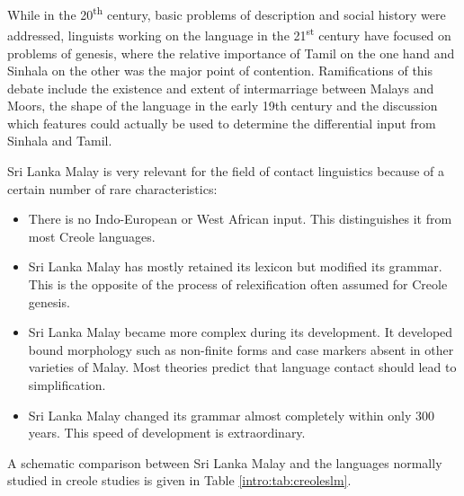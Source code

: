 While in the 20\textsuperscript{th} century, basic problems of description and social history were addressed, linguists working on the language in the 21\textsuperscript{st} century have focused on problems of genesis, where the relative importance of Tamil on the one hand and Sinhala on the other was the major point of contention. Ramifications of this debate include the existence and extent of intermarriage between Malays and Moors, the shape of the language in the early 19th century and the discussion which features could actually be used to determine the differential input from Sinhala and Tamil.

Sri Lanka Malay is very relevant for the field of contact linguistics because of a certain number of rare characteristics:
\begin{itemize}
 \item There is no Indo-European or West African input. This distinguishes it from most Creole languages.
 \item Sri Lanka Malay has mostly retained its lexicon but modified its grammar. This is the opposite of the  process of relexification often assumed for Creole genesis.
 \item Sri Lanka Malay became more complex during its development. It developed bound morphology such as non-finite forms and case markers absent in other varieties of Malay. Most theories predict that language contact should lead to simplification.
\item Sri Lanka Malay changed its grammar almost completely within only 300 years. This speed of development is extraordinary.
\end{itemize}


A schematic comparison between Sri Lanka Malay and the languages normally studied in creole studies is given in Table \ref{intro:tab:creoleslm}.

